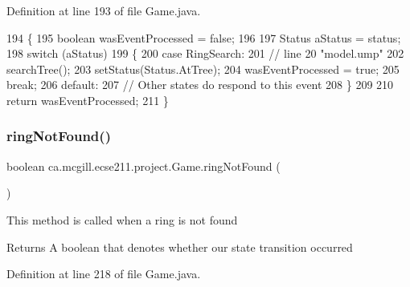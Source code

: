Definition at line 193 of file Game.\+java.


\begin{DoxyCode}
194   \{
195     \textcolor{keywordtype}{boolean} wasEventProcessed = \textcolor{keyword}{false};
196     
197     Status aStatus = status;
198     \textcolor{keywordflow}{switch} (aStatus)
199     \{
200       \textcolor{keywordflow}{case} RingSearch:
201         \textcolor{comment}{// line 20 "model.ump"}
202         searchTree();
203         setStatus(Status.AtTree);
204         wasEventProcessed = \textcolor{keyword}{true};
205         \textcolor{keywordflow}{break};
206       \textcolor{keywordflow}{default}:
207         \textcolor{comment}{// Other states do respond to this event}
208     \}
209 
210     \textcolor{keywordflow}{return} wasEventProcessed;
211   \}
\end{DoxyCode}
\mbox{\label{enumca_1_1mcgill_1_1ecse211_1_1project_1_1_game_adc2725f291b0688a62f85db1df1ee2b2}} 
\subsubsection{\texorpdfstring{ring\+Not\+Found()}{ringNotFound()}}
{\footnotesize\ttfamily boolean ca.\+mcgill.\+ecse211.\+project.\+Game.\+ring\+Not\+Found (\begin{DoxyParamCaption}{ }\end{DoxyParamCaption})}

This method is called when a ring is not found

\begin{DoxyReturn}{Returns}
A boolean that denotes whether our state transition occurred 
\end{DoxyReturn}


Definition at line 218 of file Game.\+java.


